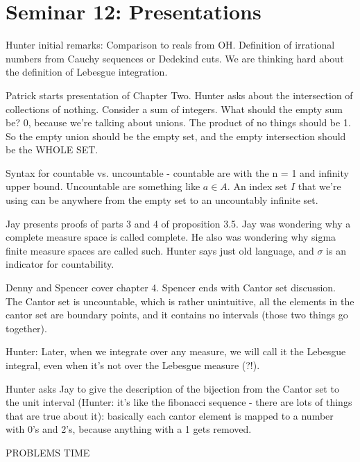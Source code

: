 \begin{sloppypar}
\section{Seminar 12: Presentations}
\indent Hunter initial remarks: Comparison to reals from OH. Definition of irrational numbers from Cauchy sequences or Dedekind cuts. We are thinking hard about the definition of Lebesgue integration.

Patrick starts presentation of Chapter Two. Hunter asks about the intersection of collections of nothing. Consider a sum of integers. What should the empty sum be? 0, because we're talking about unions. The product of no things should be 1. So the empty union should be the empty set, and the empty intersection should be the WHOLE SET.

Syntax for countable vs. uncountable - countable are with the n = 1 and infinity upper bound. Uncountable are something like $a \in A$. An index set $I$ that we're using can be anywhere from the empty set to an uncountably infinite set.

Jay presents proofs of parts 3 and 4 of proposition 3.5. Jay was wondering why a complete measure space is called complete. He also was wondering why sigma finite measure spaces are called such. Hunter says just old language, and $\sigma$ is an indicator for countability.

Denny and Spencer cover chapter 4. Spencer ends with Cantor set discussion. The Cantor set is uncountable, which is rather unintuitive, all the elements in the cantor set are boundary points, and it contains no intervals (those two things go together).

Hunter: Later, when we integrate over any measure, we will call it the Lebesgue integral, even when it's not over the Lebesgue measure (?!).

Hunter asks Jay to give the description of the bijection from the Cantor set to the unit interval (Hunter: it's like the fibonacci sequence - there are lots of things that are true about it): basically each cantor element is mapped to a number with 0's and 2's, because anything with a 1 gets removed.

PROBLEMS TIME

\end{sloppypar}
